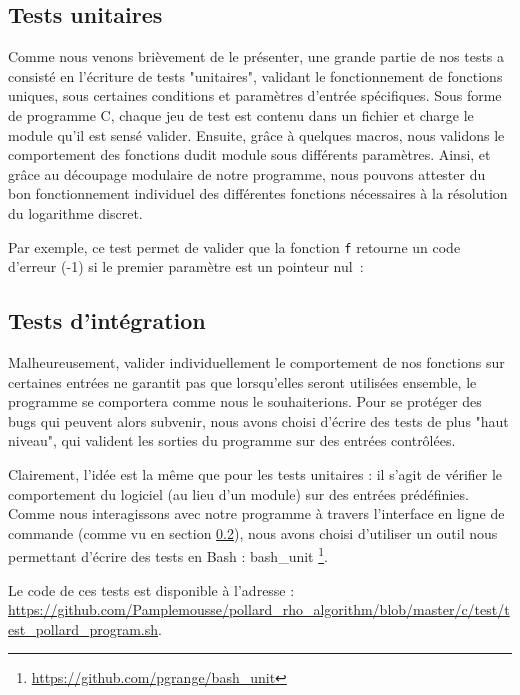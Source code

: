       \subsection{Tests unitaires}
      Comme nous venons brièvement de le présenter, une grande partie de nos tests a consisté en l'écriture de tests "unitaires", validant le fonctionnement de fonctions uniques, sous certaines conditions et paramètres d'entrée spécifiques.
      Sous forme de programme C, chaque jeu de test est contenu dans un fichier et charge le module qu'il est sensé valider. Ensuite, grâce à quelques macros, nous validons le comportement des fonctions dudit module sous différents paramètres.
      Ainsi, et grâce au découpage modulaire de notre programme, nous pouvons attester du bon fonctionnement individuel des différentes fonctions nécessaires à la résolution du logarithme discret.

      Par exemple, ce test permet de valider que la fonction \lstinline{f} retourne un code d'erreur (-1) si le premier paramètre est un pointeur nul~:

      


      \subsection{Tests d'intégration}
      Malheureusement, valider individuellement le comportement de nos fonctions sur certaines entrées ne garantit pas que lorsqu'elles seront utilisées ensemble, le programme se comportera comme nous le souhaiterions.
      Pour se protéger des bugs qui peuvent alors subvenir, nous avons choisi d'écrire des tests de plus "haut niveau", qui valident les sorties du programme sur des entrées contrôlées.

      Clairement, l'idée est la même que pour les tests unitaires : il s'agit de vérifier le comportement du logiciel (au lieu d'un module) sur des entrées prédéfinies. Comme nous interagissons avec notre programme à travers l'interface en ligne de commande (comme vu en section \ref{}), nous avons choisi d'utiliser un outil nous permettant d'écrire des tests en Bash : bash\_unit \footnote{\url{https://github.com/pgrange/bash_unit}}.

      \begin{sloppypar}
        Le code de ces tests est disponible à l'adresse : \url{https://github.com/Pamplemousse/pollard_rho_algorithm/blob/master/c/test/test_pollard_program.sh}.
      \end{sloppypar}

